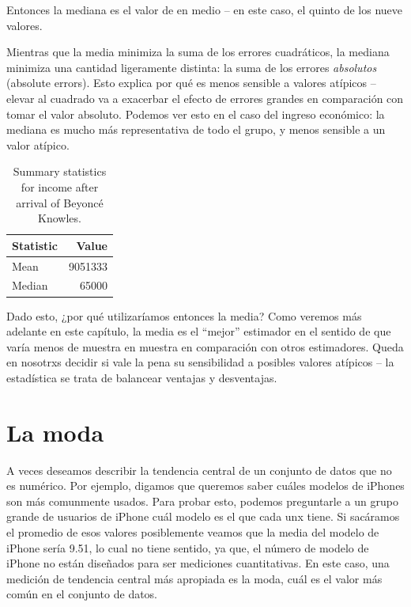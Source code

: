 \documentclass[
  12pt,
]{book}
\theoremstyle{definition}
\theoremstyle{definition}
\theoremstyle{definition}
\theoremstyle{remark}
\begin{document}
Entonces la mediana es el valor de en medio -- en este caso, el quinto de los nueve valores.

Mientras que la media minimiza la suma de los errores cuadráticos, la mediana minimiza una cantidad ligeramente distinta: la suma de los errores \emph{absolutos} (absolute errors). Esto explica por qué es menos sensible a valores atípicos -- elevar al cuadrado va a exacerbar el efecto de errores grandes en comparación con tomar el valor absoluto. Podemos ver esto en el caso del ingreso económico: la mediana es mucho más representativa de todo el grupo, y menos sensible a un valor atípico.

\begin{table}

\caption{\label{tab:unnamed-chunk-20}Summary statistics for income after arrival of Beyoncé Knowles.}
\centering
\begin{tabular}[t]{l|r}
\hline
Statistic & Value\\
\hline
Mean & 9051333\\
\hline
Median & 65000\\
\hline
\end{tabular}
\end{table}

Dado esto, ¿por qué utilizaríamos entonces la media? Como veremos más adelante en este capítulo, la media es el ``mejor'' estimador en el sentido de que varía menos de muestra en muestra en comparación con otros estimadores. Queda en nosotrxs decidir si vale la pena su sensibilidad a posibles valores atípicos -- la estadística se trata de balancear ventajas y desventajas.

\hypertarget{la-moda}{%
\section{La moda}\label{la-moda}}

A veces deseamos describir la tendencia central de un conjunto de datos que no es numérico. Por ejemplo, digamos que queremos saber cuáles modelos de iPhones son más comunmente usados. Para probar esto, podemos preguntarle a un grupo grande de usuarios de iPhone cuál modelo es el que cada unx tiene. Si sacáramos el promedio de esos valores posiblemente veamos que la media del modelo de iPhone sería 9.51, lo cual no tiene sentido, ya que, el número de modelo de iPhone no están diseñados para ser mediciones cuantitativas. En este caso, una medición de tendencia central más apropiada es la moda, cuál es el valor más común en el conjunto de datos.
\end{document}
